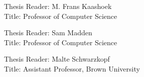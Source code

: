 \documentclass[fontsize=12pt,paper=letter]{scrartcl}
\begin{document}
\begin{titlepage}
\begin{flushleft}
  \vspace{0.5\baselineskip}
  Thesis Reader: M. Frans Kaashoek\\
  Title: Professor of Computer Science

  \vspace{0.5\baselineskip}
  Thesis Reader: Sam Madden\\
  Title: Professor of Computer Science

  \vspace{0.5\baselineskip}
  Thesis Reader: Malte Schwarzkopf\\
  Title: Assistant Professor, Brown University
  \end{flushleft}
\end{titlepage}
\end{document}
